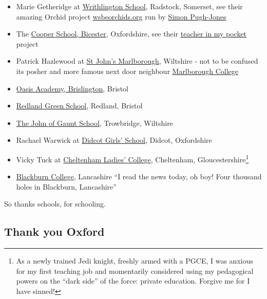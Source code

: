 \documentclass[
]{book}
\providecommand{\tightlist}{%
  \setlength{\itemsep}{0pt}\setlength{\parskip}{0pt}}
\begin{document}
\begin{itemize}
\tightlist
\item
  Marie Getheridge at \href{https://en.wikipedia.org/wiki/Writhlington_School}{Writhlington School}, Radstock, Somerset, see their amazing Orchid project \href{https://wsbeorchids.org/thirty-years-of-the-writhlington-schools-orchid-project-a-teachers-view-by-simon-pugh-jones/}{wsbeorchids.org} run by \href{https://www.bristol.ac.uk/graduation/honorary-degrees/honorary-graduates-2019/simon-pugh-jones/}{Simon Pugh-Jones}
\item
  The \href{https://en.wikipedia.org/wiki/Cooper_School,_Bicester}{Cooper School, Bicester}, Oxfordshire, see their \href{https://www.youtube.com/watch?v=XdywHl2ZA-I}{teacher in my pocket} project
\item
  Patrick Hazlewood at \href{https://en.wikipedia.org/wiki/St_John\%27s_Marlborough}{St John's Marlborough}, Wiltshire - not to be confused its posher and more famous next door neighbour \href{https://en.wikipedia.org/wiki/Marlborough_College}{Marlborough College}
\item
  \href{https://en.wikipedia.org/wiki/Oasis_Academy_Brislington}{Oasis Academy, Brislington}, Bristol
\item
  \href{https://en.wikipedia.org/wiki/Redland_Green_School}{Redland Green School}, Redland, Bristol
\item
  \href{https://en.wikipedia.org/wiki/The_John_of_Gaunt_School}{The John of Gaunt School}, Trowbridge, Wiltshire
\item
  Rachael Warwick at \href{https://en.wikipedia.org/wiki/Didcot_Girls\%27_School}{Didcot Girls' School}, Didcot, Oxfordshire
\item
  Vicky Tuck at \href{https://en.wikipedia.org/wiki/Cheltenham_Ladies\%27_College}{Cheltenham Ladies' College}, Cheltenham, Gloucestershire\footnote{As a newly trained Jedi knight, freshly armed with a PGCE, I was anxious for my first teaching job and momentarily considered using my pedagogical powers on the ``dark side'' of the force: private education. \citep{nicebutdim} Forgive me for I have sinned!}
\item
  \href{https://en.wikipedia.org/wiki/Blackburn_College,_Lancashire}{Blackburn College}, Lancashire ``I read the news today, oh boy! Four thousand holes in Blackburn, Lancashire'' \citep{adayinthelife}
\end{itemize}

So thanks schools, for schooling. 🙏

\hypertarget{oxford}{%
\subsection{Thank you Oxford}\label{oxford}}
\end{document}
